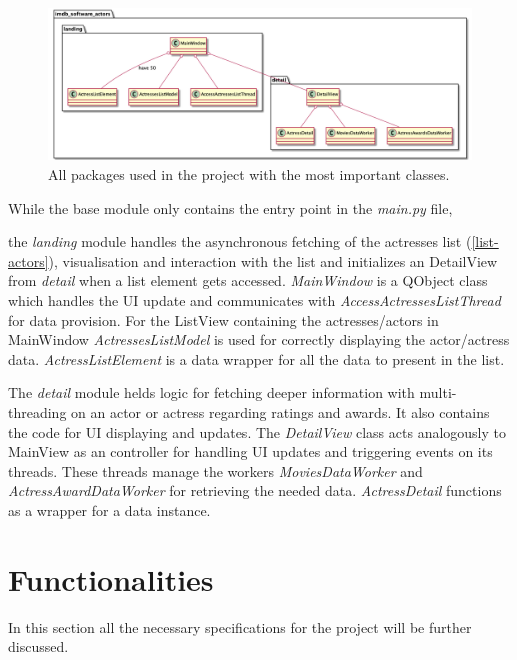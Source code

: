 \documentclass[12pt]{article}
\begin{document}
\begin{figure}[H]
      \begin{center}
            \includegraphics[scale=0.32]{img/class_diagram.png}
            \caption{\label{fig:packages} All packages used in the project with
                  the most important classes.}
      \end{center}
\end{figure}

While the base module only contains the entry point in the \textit{main.py} file,

the \textit{landing} module handles the asynchronous fetching of the actresses 
list (\ref{list-actors}), visualisation and interaction with the list and initializes an DetailView 
from \textit{detail} when a list element gets accessed.
\textit{MainWindow} is a QObject class which handles the UI update and communicates with 
\textit{AccessActressesListThread} for data provision. For the ListView containing the actresses/actors 
in MainWindow \textit{ActressesListModel} is used for correctly displaying the actor/actress data.
\textit{ActressListElement} is a data wrapper for all the data to present in the list.

The \textit{detail} module helds logic for fetching deeper information with multi-threading on 
an actor or actress regarding ratings and awards. It also contains the code for UI displaying and 
updates.
The \textit{DetailView} class acts analogously to MainView as an controller for handling UI updates and
triggering events on its threads. These threads manage the workers \textit{MoviesDataWorker} and 
\textit{ActressAwardDataWorker} for retrieving the needed data. \textit{ActressDetail} functions as a 
wrapper for a data instance.

\newpage

\section{Functionalities}
In this section all the necessary specifications for the project will be further discussed.
\end{document}
